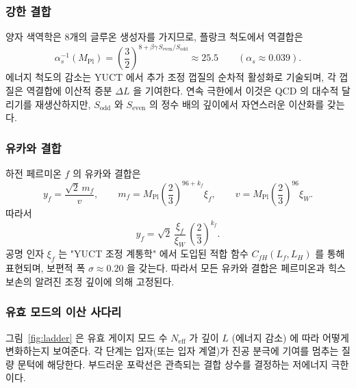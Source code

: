 \documentclass[12pt,a4paper]{article}
\begin{document}
	\subsubsection{강한 결합}
	양자 색역학은 8개의 글루온 생성자를 가지므로, 플랑크 척도에서 역결합은
	\begin{equation}
		\alpha_s^{-1}(M_{\mathrm{Pl}}) = \left(\frac{3}{2}\right)^{\!8 + \beta\gamma\,S_{\mathrm{even}}/S_{\mathrm{odd}}}
		\approx 25.5 \qquad (\alpha_s \approx 0.039) .
	\end{equation}
	에너지 척도의 감소는 YUCT 에서 추가 조정 껍질의 순차적 활성화로 기술되며, 각 껍질은 역결합에 이산적 증분 \(\Delta L\) 을 기여한다. 연속 극한에서 이것은 QCD 의 대수적 달리기를 재생산하지만, \(S_{\mathrm{odd}}\) 와 \(S_{\mathrm{even}}\) 의 정수 배의 깊이에서 자연스러운 이산화를 갖는다.
	
	\subsubsection{유카와 결합}
	하전 페르미온 \(f\) 의 유카와 결합은
	\begin{equation}
		y_f = \frac{\sqrt{2}\,m_f}{v},
		\qquad
		m_f = M_{\mathrm{Pl}}\left(\frac{2}{3}\right)^{\!96+k_f}\xi_f,
		\qquad
		v   = M_{\mathrm{Pl}}\left(\frac{2}{3}\right)^{\!96}\xi_W .
	\end{equation}
	따라서
	\begin{equation}
		y_f = \sqrt{2}\,\frac{\xi_f}{\xi_W}\,\left(\frac{2}{3}\right)^{\!k_f} .
	\end{equation}
	공명 인자 \(\xi_f\) 는 "YUCT 조정 계통학" 에서 도입된 적합 함수 \(C_{fH}(L_f,L_H)\) 를 통해 표현되며, 보편적 폭 \(\sigma \approx 0.20\) 을 갖는다. 따라서 모든 유카와 결합은 페르미온과 힉스 보손의 알려진 조정 깊이에 의해 고정된다.
	
	\subsubsection{유효 모드의 이산 사다리}
	그림~\ref{fig:ladder} 은 유효 게이지 모드 수 \(N_{\mathrm{eff}}\) 가 깊이 \(L\) (에너지 감소) 에 따라 어떻게 변화하는지 보여준다. 각 단계는 입자(또는 입자 계열)가 진공 분극에 기여를 멈추는 질량 문턱에 해당한다. 부드러운 포락선은 관측되는 결합 상수를 결정하는 저에너지 극한이다.
	
\end{document}

